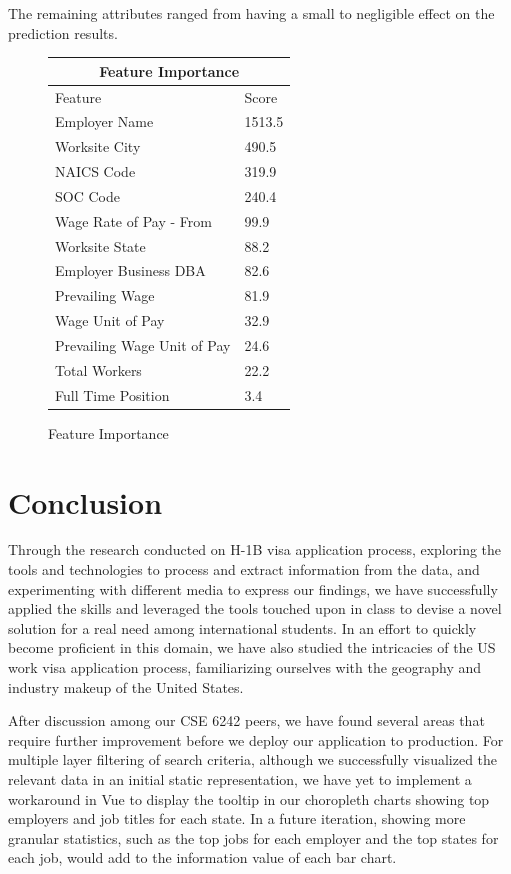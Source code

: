 \documentclass[sigconf]{acmart}
\begin{document}
The remaining attributes ranged from having a small to negligible effect on the prediction results. 


\begin{figure}
  \begin{tabular}{ |p{4cm}||p{2cm}|  }
    \hline
    \multicolumn{2}{|c|}{\textbf{Feature Importance}} \\
    \hline
    Feature & Score\\
    \hline
    Employer Name & 1513.5\\
    Worksite City & 490.5\\
    NAICS Code & 319.9\\
    SOC Code & 240.4\\
    Wage Rate of Pay - From & 99.9\\
    Worksite State & 88.2\\
    Employer Business DBA & 82.6\\
    Prevailing Wage & 81.9\\
    Wage Unit of Pay & 32.9\\
    Prevailing Wage Unit of Pay & 24.6\\
    Total Workers & 22.2\\
    Full Time Position & 3.4\\
    \hline
   \end{tabular}
  \caption{Feature Importance}
   \label{fig:featureimportance}
\end{figure}


\section{Conclusion} 

Through the research conducted on H-1B visa application process, exploring the tools and technologies 
to process and extract information from the data, and experimenting with different media to 
express our findings, we have successfully applied the skills and leveraged the tools touched 
upon in class to devise a novel solution for a real need among international students. 
In an effort to quickly become proficient in this domain, we have also studied 
the intricacies of the US work visa application process, familiarizing ourselves 
with the geography and industry makeup of the United States. 

After discussion among our CSE 6242 peers, we have found several areas that require further 
improvement before we deploy our application to production. 
For multiple layer filtering of search criteria, although we successfully visualized the 
relevant data in an initial static representation, we have yet to implement a workaround 
in Vue to display the tooltip in our choropleth charts showing top employers 
and job titles for each state. In a future iteration, showing more granular statistics, 
such as the top jobs for each employer and the top states for each job, would add to 
the information value of each bar chart. 
\end{document}
